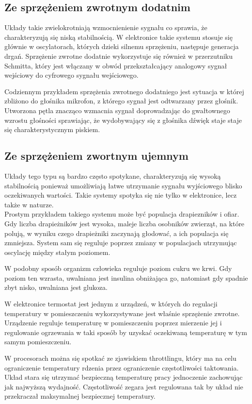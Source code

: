 \documentclass{article}
\begin{document}
\subsection{Ze sprzężeniem zwrotnym dodatnim}


\quad Układy takie zwielokrotniają wzmocnienienie sygnału co sprawia, że charakteryzują się niską stabilnością. 
W elektronice takie systemu stosuje się głównie w oscylatorach, których dzieki silnemu sprzężeniu, następuje generacja drgań.
Sprzężenie zwrotne dodatnie wykorzystuje się również w przerzutniku Schmitta, który jest włączany w obwód przekształcający analogowy sygnał wejściowy do cyfrowego sygnału wejściowego.

Codziennym przykładem sprzężenia zwrotnego dodatniego jest sytuacja w której zbliżono do głośnika mikrofon, z którego sygnał jest odtwarzany przez głośnik. Utworzona pętla znacząco wzmacnia sygnał doprowadzając do gwałtownego wzrostu głośności sprawiając, że wydobywający się z głośnika dźwięk staje staje się charakterystycznym piskiem.

\subsection{Ze sprzężeniem zwortnym ujemnym}

\quad Układy tego typu są bardzo często spotykane, charakteryzują się wysoką stabilnością ponieważ umożliwiają łatwe utrzymanie sygnału wyjściowego blisko oczekiwanych wartości. Takie systemy spotyka się nie tylko w elektronice, lecz także w naturze.\\ Prostym przykładem takiego systemu może być populacja drapiezników i ofiar. Gdy liczba drapieżników jest wysoka, maleje liczba osobników zwierząt, na które polują, w wyniku czego drapieżniki zaczynają głodować, a ich populacja się zmniejsza. System sam się reguluje poprzez zmiany w populacjach utrzymując oscylację między stałym poziomem. 

W podobny sposób organizm człowieka reguluje poziom cukru we krwi. 
Gdy poziom ten wzrasta, uwalniana jest insulina obniżająca go, natomiast gdy spadnie zbyt nisko, uwalniana jest glukoza.

W elektronice termostat jest jednym z urządzeń, w których do regulacji temperatury w pomieszczeniu wykorzystywane jest właśnie sprzężenie zwrotne. 
Urządzenie reguluje temperaturę w pomieszczeniu poprzez mierzenie jej i regulowanie ogrzewania w taki sposób by uzyskać oczekiwaną temperaturę w tym samym pomieszczeniu.

W procesorach można się spotkać ze zjawiskiem throttlingu, który ma na celu ograniczenie temperatury rdzenia przez ograniczenie częstotliwości taktowania. 
Układ stara się utrzymać bezpieczną temperaturę pracy jednoczenie zachowując jak najwyższą wydajność. 
Częstotliwość zegara jest regulowana tak by układ nie przekraczał maksymalnej bezpiecznej temperatury.
\end{document}
